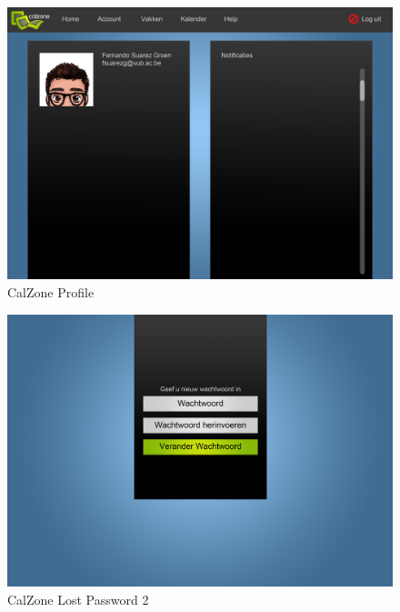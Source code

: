 \begin{center}
\begin{figure}[H]
\caption{CalZone Profile}
\centerline{\includegraphics[scale=0.4]{img/Calzoneprofile}}
\label{fig:CalZone Profile}
\end{figure}

\begin{figure}[H]
\caption{CalZone Lost Password 2}
\centerline{\includegraphics[scale=0.4]{img/Calzonelostpassword2}}
\label{fig:CalZone Lost Password 2}
\end{figure}
\end{center}

